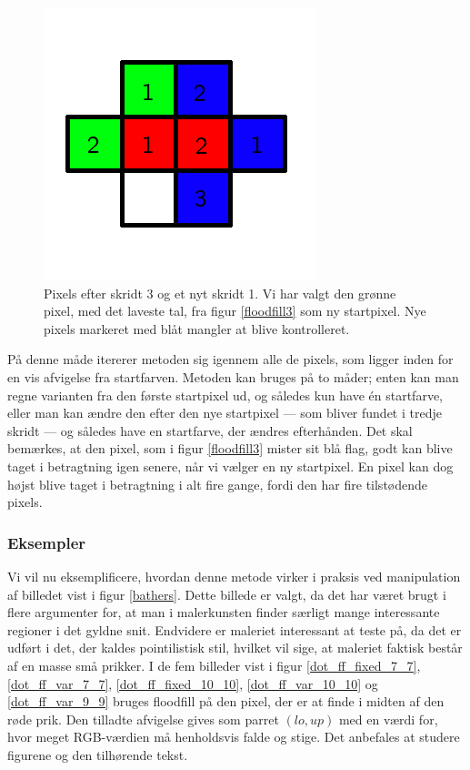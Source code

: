 {\begin{figure}[!h]
    \begin{center}
        \includegraphics[scale=0.42,angle=0]{afsnit/vores_implementation/billeder/flood_fill/floodfill4}
    \end{center}
    \caption[]{Pixels efter skridt 3 og et nyt skridt 1. Vi har valgt
    den grønne pixel, med det laveste tal, fra figur \ref{floodfill3} som
    ny startpixel. Nye pixels markeret med blåt mangler at blive
    kontrolleret.}
    \label{floodfill4}
\end{figure}

På denne måde itererer metoden sig igennem alle de pixels, som ligger
inden for en vis afvigelse fra startfarven. Metoden kan bruges på to
måder; enten kan man regne varianten fra den første startpixel ud, og
således kun have én startfarve, eller man kan ændre den efter den nye
startpixel --- som bliver fundet i tredje skridt --- og således have en
startfarve, der ændres efterhånden. Det skal bemærkes, at den pixel, som
i figur \ref{floodfill3} mister sit blå flag, godt kan blive taget i
betragtning igen senere, når vi vælger en ny startpixel. En pixel kan
dog højst blive taget i betragtning i alt fire gange, fordi den har fire
tilstødende pixels.

\subsubsection{Eksempler}
Vi vil nu eksemplificere, hvordan denne metode virker i praksis ved
manipulation af billedet vist i figur \ref{bathers}.  Dette billede er
valgt, da det har været brugt i flere argumenter for, at man i
malerkunsten finder særligt mange interessante regioner i det gyldne
snit\cite{GoldenNumber}\cite{RatioArt}. Endvidere er maleriet
interessant at teste på, da det er udført i det, der kaldes
pointilistisk stil, hvilket vil sige, at maleriet faktisk består af en
masse små prikker. I de fem billeder vist i figur
\ref{dot_ff_fixed_7_7}, \ref{dot_ff_var_7_7}, \ref{dot_ff_fixed_10_10},
\ref{dot_ff_var_10_10} og \ref{dot_ff_var_9_9} bruges floodfill på den
pixel, der er at finde i midten af den røde prik. Den tilladte afvigelse
gives som parret $(lo, up)$ med en værdi for, hvor meget RGB-værdien må
henholdsvis falde og stige. Det anbefales at studere figurene og den
tilhørende tekst.

}
